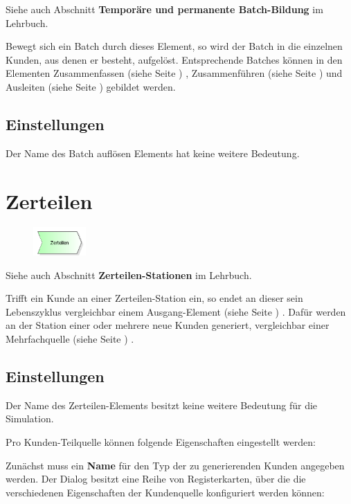 Siehe auch Abschnitt \textbf{Temporäre und permanente Batch-Bildung} im Lehrbuch.

Bewegt sich ein Batch durch dieses Element, so wird der Batch in die einzelnen Kunden, aus denen er
besteht, aufgelöst. Entsprechende Batches können in den Elementen Zusammenfassen (siehe Seite \pageref{ref:ModelElementBatch}) ,
Zusammenführen (siehe Seite \pageref{ref:ModelElementMatch}) und Ausleiten (siehe Seite \pageref{ref:ModelElementPickUp}) 
gebildet werden.

\subsection*{Einstellungen}

Der Name des Batch auflösen Elements hat keine weitere Bedeutung.


\section{Zerteilen}
\label{ref:ModelElementSplit}

\begin{figure}
\vspace{-22pt}
\includegraphics[width=2cm]{imageModelElementSplit.png}
\vspace{-22pt}
\end{figure}

Siehe auch Abschnitt \textbf{Zerteilen-Stationen} im Lehrbuch.

Trifft ein Kunde an einer Zerteilen-Station ein, so endet an dieser sein
Lebenszyklus vergleichbar einem Ausgang-Element (siehe Seite \pageref{ref:ModelElementDispose}) .
Dafür werden an der Station einer oder mehrere neue Kunden generiert, vergleichbar
einer Mehrfachquelle (siehe Seite \pageref{ref:ModelElementSourceMulti}) .

\subsection*{Einstellungen}

Der Name des Zerteilen-Elements besitzt keine weitere Bedeutung für die Simulation.

Pro Kunden-Teilquelle können folgende Eigenschaften eingestellt werden: 

Zunächst muss ein \textbf{Name} für den Typ der zu generierenden Kunden angegeben werden.
Der Dialog besitzt eine Reihe von Registerkarten, über die die verschiedenen Eigenschaften
der Kundenquelle konfiguriert werden können:

